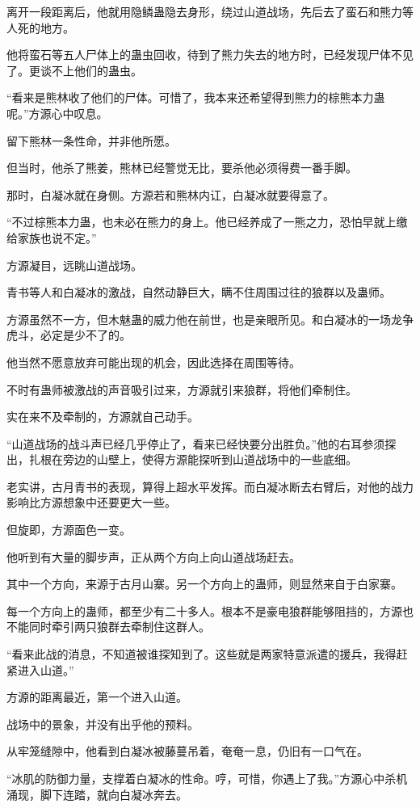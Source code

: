 \begin{this_body}
离开一段距离后，他就用隐鳞蛊隐去身形，绕过山道战场，先后去了蛮石和熊力等人死的地方。

他将蛮石等五人尸体上的蛊虫回收，待到了熊力失去的地方时，已经发现尸体不见了。更谈不上他们的蛊虫。

“看来是熊林收了他们的尸体。可惜了，我本来还希望得到熊力的棕熊本力蛊呢。”方源心中叹息。

留下熊林一条性命，并非他所愿。

但当时，他杀了熊姜，熊林已经警觉无比，要杀他必须得费一番手脚。

那时，白凝冰就在身侧。方源若和熊林内讧，白凝冰就要得意了。

“不过棕熊本力蛊，也未必在熊力的身上。他已经养成了一熊之力，恐怕早就上缴给家族也说不定。”

方源凝目，远眺山道战场。

青书等人和白凝冰的激战，自然动静巨大，瞒不住周围过往的狼群以及蛊师。

方源虽然不一方，但木魅蛊的威力他在前世，也是亲眼所见。和白凝冰的一场龙争虎斗，必定是少不了的。

他当然不愿意放弃可能出现的机会，因此选择在周围等待。

不时有蛊师被激战的声音吸引过来，方源就引来狼群，将他们牵制住。

实在来不及牵制的，方源就自己动手。

“山道战场的战斗声已经几乎停止了，看来已经快要分出胜负。”他的右耳参须探出，扎根在旁边的山壁上，使得方源能探听到山道战场中的一些底细。

老实讲，古月青书的表现，算得上超水平发挥。而白凝冰断去右臂后，对他的战力影响比方源想象中还要更大一些。

但旋即，方源面色一变。

他听到有大量的脚步声，正从两个方向上向山道战场赶去。

其中一个方向，来源于古月山寨。另一个方向上的蛊师，则显然来自于白家寨。

每一个方向上的蛊师，都至少有二十多人。根本不是豪电狼群能够阻挡的，方源也不能同时牵引两只狼群去牵制住这群人。

“看来此战的消息，不知道被谁探知到了。这些就是两家特意派遣的援兵，我得赶紧进入山道。”

方源的距离最近，第一个进入山道。

战场中的景象，并没有出乎他的预料。

从牢笼缝隙中，他看到白凝冰被藤蔓吊着，奄奄一息，仍旧有一口气在。

“冰肌的防御力量，支撑着白凝冰的性命。哼，可惜，你遇上了我。”方源心中杀机涌现，脚下连踏，就向白凝冰奔去。


\end{this_body}
